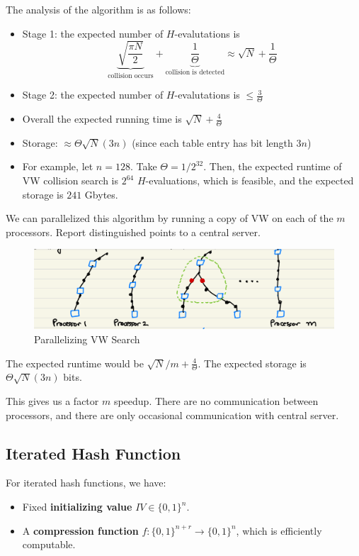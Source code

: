 \documentclass[12pt,titlepage]{article}
\begin{document}
The analysis of the algorithm is as follows: \begin{itemize}
\item Stage 1: the expected number of $H$-evalutations is $$\underbrace{\sqrt{\frac{\pi N}{2}}}_{\text{collision occurs}} + \underbrace{\frac{1}{\Theta}}_{\text{collision is detected}} \approx \sqrt{N} + \frac{1}{\Theta}$$
\item Stage 2: the expected number of $H$-evalutations is $\leq \frac{3}{\Theta}$
\item Overall the expected running time is $\sqrt{N} + \frac{4}{\Theta}$
\item Storage: $\approx \Theta\sqrt{N}(3n)$ (since each table entry has bit length $3n$)
\item For example, let $n = 128$. Take $\Theta = 1/2^{32}$. Then, the expected runtime of VW collision search is $2^{64}$ $H$-evaluations, which is feasible, and the expected storage is $241$ Gbytes. 
\end{itemize}

We can parallelized this algorithm by running a copy of VW on each of the $m$ processors. Report distinguished points to a central server. 

\begin{center}
	\begin{figure}[h!]
		\includegraphics[width=\textwidth]{VW_3.png}
		\caption{Parallelizing VW Search}
	\end{figure}
\end{center}

The expected runtime would be $\sqrt{N} / m + \frac{4}{\Theta}$. The expected storage is $\Theta \sqrt{N}(3n)$ bits. 

This gives us a factor $m$ speedup. There are no communication between processors, and there are only occasional communication with central server. 


\subsection{Iterated Hash Function}
For iterated hash functions, we have: \begin{itemize}
\item Fixed \textbf{initializing value} $IV \in \{0,1\}^n$.
\item A \textbf{compression function} $f: \{0,1\}^{n+r} \rightarrow \{0,1\}^n$, which is efficiently computable. 
\end{itemize}
\end{document}
